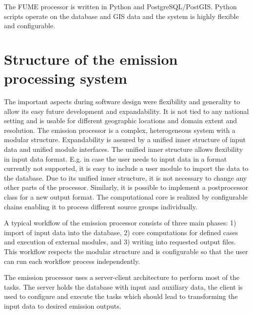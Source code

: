 \documentclass[a4paper,11pt]{article}
\begin{document}
The FUME processor is written in Python and PostgreSQL/PostGIS. Python
scripts operate on the database and GIS data and the system is highly
flexible and configurable.


\section{Structure of the emission processing system}\label{structure}
The important aspects during software design were flexibility and generality to allow its easy future development and expandability. It is not tied to any national setting and is usable for different geographic locations and domain extent and resolution. The emission processor is a complex, heterogeneous system with a modular structure. Expandability is assured by a unified inner structure of input data and unified module interfaces. The unified inner structure allows flexibility in input data format. E.g. in case the user needs to input data in a format currently not supported, it is easy to include a user module to import the data to the database. Due to its unified inner structure, it is not necessary to change any other parts of the processor. Similarly, it is possible to implement a postprocessor class for a new output format. The computational core is realized by configurable chains enabling it to process different source groups individually. 

A typical workflow of the emission processor consists of three main phases: 1) import of input data into the database, 2) core computations for defined cases and execution of external modules, and 3) writing into requested output files. This workflow respects the modular structure and is configurable so that the user can run each workflow process independently.

The emission processor uses a server-client architecture to perform most of the
tasks. The server holds the database with input and auxiliary data, the client
is used to configure and execute the tasks which should lead to transforming the
input data to desired emission outputs.
\end{document}
